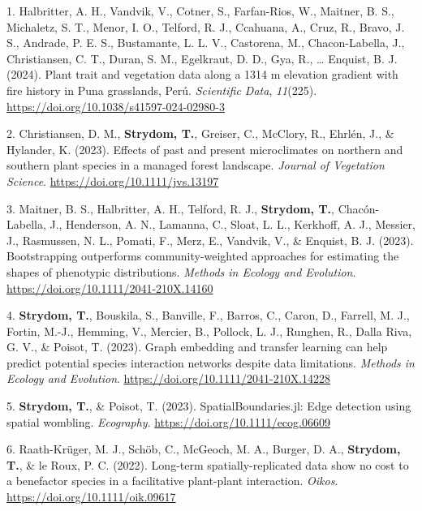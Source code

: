 \documentclass[11pt,a4paper,]{awesome-cv}
\newlength{\cslhangindent}
\newenvironment{CSLReferences}[2] %
 {\begin{list}{}{%
  \setlength{\itemindent}{0pt}
  \setlength{\leftmargin}{0pt}
  \setlength{\parsep}{0pt}
  \ifodd #1
   \setlength{\leftmargin}{\cslhangindent}
   \setlength{\itemindent}{-1\cslhangindent}
  \fi
  \setlength{\itemsep}{#2\baselineskip}}}
 {\end{list}}
\begin{document}
\label{refs-9b131a5a525913af1355f51a1e92d08c}
\begin{CSLReferences}{1}{0}
1. Halbritter, A. H., Vandvik, V., Cotner, S., Farfan-Rios, W., Maitner,
B. S., Michaletz, S. T., Menor, I. O., Telford, R. J., Ccahuana, A.,
Cruz, R., Bravo, J. S., Andrade, P. E. S., Bustamante, L. L. V.,
Castorena, M., Chacon-Labella, J., Christiansen, C. T., Duran, S. M.,
Egelkraut, D. D., Gya, R., \ldots{} Enquist, B. J. (2024). Plant trait
and vegetation data along a 1314 m elevation gradient with fire history
in Puna grasslands, Perú. \emph{Scientific Data}, \emph{11}(225).
\url{https://doi.org/10.1038/s41597-024-02980-3}

2. Christiansen, D. M., \textbf{Strydom, T.}, Greiser, C., McClory, R.,
Ehrlén, J., \& Hylander, K. (2023). Effects of past and present
microclimates on northern and southern plant species in a managed forest
landscape. \emph{Journal of Vegetation Science}.
\url{https://doi.org/10.1111/jvs.13197}

3. Maitner, B. S., Halbritter, A. H., Telford, R. J.,
\textbf{Strydom, T.}, Chacón-Labella, J., Henderson, A. N., Lamanna, C.,
Sloat, L. L., Kerkhoff, A. J., Messier, J., Rasmussen, N. L., Pomati,
F., Merz, E., Vandvik, V., \& Enquist, B. J. (2023). Bootstrapping
outperforms community-weighted approaches for estimating the shapes of
phenotypic distributions. \emph{Methods in Ecology and Evolution}.
\url{https://doi.org/10.1111/2041-210X.14160}

4. \textbf{Strydom, T.}, Bouskila, S., Banville, F., Barros, C., Caron,
D., Farrell, M. J., Fortin, M.-J., Hemming, V., Mercier, B., Pollock, L.
J., Runghen, R., Dalla Riva, G. V., \& Poisot, T. (2023). Graph
embedding and transfer learning can help predict potential species
interaction networks despite data limitations. \emph{Methods in Ecology
and Evolution}. \url{https://doi.org/10.1111/2041-210X.14228}

5. \textbf{Strydom, T.}, \& Poisot, T. (2023). SpatialBoundaries.jl:
Edge detection using spatial wombling. \emph{Ecography}.
\url{https://doi.org/10.1111/ecog.06609}

6. Raath-Krüger, M. J., Schöb, C., McGeoch, M. A., Burger, D. A.,
\textbf{Strydom, T.}, \& le Roux, P. C. (2022). Long-term
spatially-replicated data show no cost to a benefactor species in a
facilitative plant-plant interaction. \emph{Oikos}.
\url{https://doi.org/10.1111/oik.09617}


\end{CSLReferences}
\end{document}
